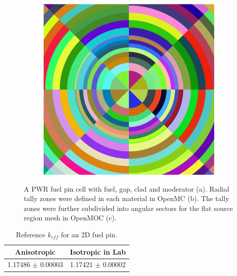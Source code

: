 \begin{figure}[h!]
\begin{subfigure}{.33\textwidth}
  \caption{}
\end{subfigure}
\begin{subfigure}{.33\textwidth}
  \centering
  \includegraphics[width=0.9\linewidth]{figures/biases/pin-cell/pin-cell-8x8}
  \caption{}
\end{subfigure}
\caption[Pin cell materials and geometry]{A PWR fuel pin cell with fuel, gap, clad and moderator (a). Radial tally zones were defined in each material in OpenMC (b). The tally zones were further subdivided into angular sectors for the flat source region mesh in OpenMOC (c).}
\label{fig:chap4-pin-cell}
\end{figure}

\begin{table}[h!]
  \centering
  \caption{Reference $k_{eff}$ for an 2D fuel pin.}
  \label{table:chap2-pin-reference} 
  \vspace{14pt}
  \begin{tabular}{c c}
  \toprule
  \multicolumn{1}{c}{\bf Anisotropic} &
  \multicolumn{1}{c}{\bf Isotropic in Lab} \\
  \midrule
  1.17486 $\pm$ 0.00003 & 1.17421 $\pm$ 0.00002 \\
  \bottomrule
\end{tabular}
\end{table}

